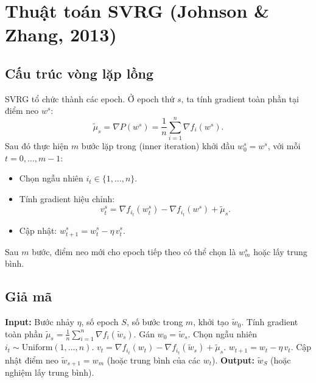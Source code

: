 \documentclass[12pt,a4paper]{report}
\theoremstyle{definition}
\begin{document}
\section{Thuật toán SVRG (Johnson \& Zhang, 2013)}
\subsection{Cấu trúc vòng lặp lồng}
SVRG tổ chức thành các epoch. Ở epoch thứ $s$, ta tính gradient toàn phần tại điểm neo $w^s$:
\begin{equation}
\tilde{\mu}_s = \nabla P(w^s) = \frac{1}{n}\sum_{i=1}^{n} \nabla f_i(w^s).
\end{equation}
Sau đó thực hiện $m$ bước lặp trong (inner iteration) khởi đầu $w_0^{s} = w^s$, với mỗi $t=0,\dots,m-1$:
\begin{itemize}
    \item Chọn ngẫu nhiên $i_t \in \{1,\dots,n\}$.
    \item Tính gradient hiệu chỉnh:
    \begin{equation}
    v_t^s = \nabla f_{i_t}(w_t^s) - \nabla f_{i_t}(w^s) + \tilde{\mu}_s.
    \label{eq:svrg_v}
    \end{equation}
    \item Cập nhật: $w_{t+1}^s = w_t^s - \eta\, v_t^s$.
\end{itemize}
Sau $m$ bước, điểm neo mới cho epoch tiếp theo có thể chọn là $w_{m}^s$ hoặc lấy trung bình.

\subsection{Giả mã}
\begin{algorithm}[htb]
\caption{SVRG cơ bản}
\label{alg:svrg}
\begin{algorithmic}[1]
\STATE \textbf{Input:} Bước nhảy $\eta$, số epoch $S$, số bước trong $m$, khởi tạo $\tilde{w}_0$.
    \STATE Tính gradient toàn phần $\tilde{\mu}_s = \frac{1}{n}\sum_{i=1}^{n} \nabla f_i(\tilde{w}_s)$.
    \STATE Gán $w_0 = \tilde{w}_s$.
        \STATE Chọn ngẫu nhiên $i_t \sim \text{Uniform}(1,\dots,n)$.
        \STATE $v_t = \nabla f_{i_t}(w_t) - \nabla f_{i_t}(\tilde{w}_s) + \tilde{\mu}_s$.
        \STATE $w_{t+1} = w_t - \eta\, v_t$.
    \ENDFOR
    \STATE Cập nhật điểm neo $\tilde{w}_{s+1} = w_m$ (hoặc trung bình của các $w_t$).
\ENDFOR
\STATE \textbf{Output:} $\tilde{w}_S$ (hoặc nghiệm lấy trung bình).
\end{algorithmic}
\end{algorithm}
\end{document}
